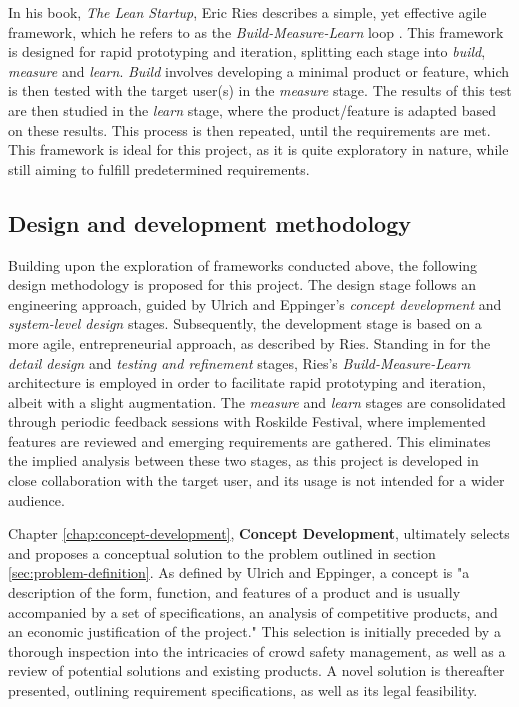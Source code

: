 In his book, \textit{The Lean Startup}, Eric Ries describes a simple, yet effective agile framework, which he refers to as the \textit{Build-Measure-Learn} loop \cite{lean_startup}. This framework is designed for rapid prototyping and iteration, splitting each stage into \textit{build}, \textit{measure} and \textit{learn}. \textit{Build} involves developing a minimal product or feature, which is then tested with the target user(s) in the \textit{measure} stage. The results of this test are then studied in the \textit{learn} stage, where the product/feature is adapted based on these results. This process is then repeated, until the requirements are met. This framework is ideal for this project, as it is quite exploratory in nature, while still aiming to fulfill predetermined requirements.

\subsection{Design and development methodology}

Building upon the exploration of frameworks conducted above, the following design methodology is proposed for this project. The design stage follows an engineering approach, guided by Ulrich and Eppinger's \textit{concept development} and \textit{system-level design} stages. Subsequently, the development stage is based on a more agile, entrepreneurial approach, as described by Ries. Standing in for the \textit{detail design} and \textit{testing and refinement} stages, Ries's \textit{Build-Measure-Learn} architecture is employed in order to facilitate rapid prototyping and iteration, albeit with a slight augmentation. The \textit{measure} and \textit{learn} stages are consolidated through periodic feedback sessions with Roskilde Festival, where implemented features are reviewed and emerging requirements are gathered. This eliminates the implied analysis between these two stages, as this project is developed in close collaboration with the target user, and its usage is not intended for a wider audience.

Chapter \ref{chap:concept-development}, \textbf{Concept Development}, ultimately selects and proposes a conceptual solution to the problem outlined in section \ref{sec:problem-definition}. As defined by Ulrich and Eppinger, a concept is "a description of the form, function, and features of a product and is usually accompanied by a set of specifications, an analysis of competitive products, and an economic justification of the project." \cite{ulrich_eppinger} This selection is initially preceded by a thorough inspection into the intricacies of crowd safety management, as well as a review of potential solutions and existing products. A novel solution is thereafter presented, outlining requirement specifications, as well as its legal feasibility.

